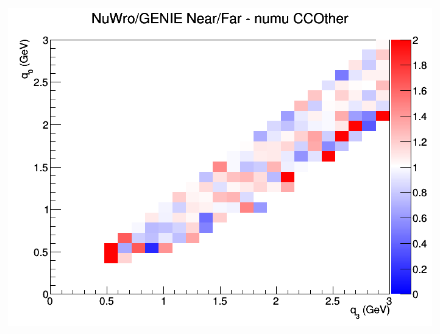 \begin{figure}[h]
\endminipage
{}
\includegraphics[width=\linewidth]{q0_q3/nominal/ratios/CCOther_NuWro_GENIE_numu_NF_q3_q0.png}
\endminipage
\newline
\end{figure}
\clearpage
